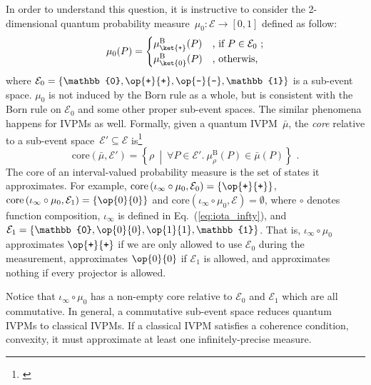 \documentclass[english,reprint, aps, prl,superscriptaddress, showpacs,
showkeys, longbibliography, amsmath, amssymb]{revtex4-1}
\theoremstyle{plain}
\theoremstyle{definition}
\newcommand{\events}{\ensuremath{\mathcal{E}}}
\newcommand{\proj}[1]{\op{#1}{#1}}
\newcommand{\ps}{\texttt{+}}
\newcommand{\ms}{\texttt{-}}
\newcommand{\yutsung}[1]{\begin{framed}\begin{minipage}{0.9\linewidth}\color{purple}{Yu-Tsung says: #1}\end{minipage}\end{framed}}
\newcommand{\set}[2]{\ensuremath{\left\{ {#1}~\middle|~{#2}\right\} }}
\begin{document}
In order to understand this question, it is instructive to consider
the 2-dimensional quantum probability measure~$\mu_{0}:\events\rightarrow[0,1]$
defined as follow:
\begin{equation}
\mu_{0}(P)=\begin{cases}
\mu_{\ket{\ps}}^{\mathrm{B}}(P) & \textrm{, if }P\in\events_{0}\textrm{ ;}\\
\mu_{\ket{0}}^{\mathrm{B}}(P) & \textrm{, otherwis,}
\end{cases}
\end{equation}
where $\events_{0}=\left\{ \mathbb{0},\proj{\ps},\proj{\ms},\mathbb{1}\right\} $
is a sub-event space. $\mu_{0}$ is not induced by the Born rule as
a whole, but is consistent with the Born rule on $\events_{0}$ and
some other proper sub-event spaces. The similar phenomena happens
for IVPMs as well. Formally, given a quantum IVPM~$\bar{\mu}$, the
\emph{core} relative to a sub-event space~$\events'\subseteq\events$
is\footnote{\yutsung{I changed the definition of core to embedding the Born rule.
While this change might make it easier to explain the core of quantum
IVPMs, should we explain the meaning of the Born rule for classical
probability measures?}}
\begin{equation}
\mathrm{core}\left(\bar{\mu},\events'\right)=\set{\rho}{\forall P\in\events'.~\mu_{\rho}^{\mathrm{B}}\left(P\right)\in\bar{\mu}\left(P\right)}\textrm{ .}
\end{equation}
The core of an interval-valued probability measure is the set of states
it approximates. For example, $\mathrm{core}\left(\iota_{\infty}\circ\mu_{0},\events_{0}\right)=\left\{ \proj{\ps}\right\} $,
$\mathrm{core}\left(\iota_{\infty}\circ\mu_{0},\events_{1}\right)=\left\{ \proj{0}\right\} $
and $\mathrm{core}\left(\iota_{\infty}\circ\mu_{0},\events\right)=\emptyset$,
where $\circ$ denotes function composition, $\iota_{\infty}$ is
defined in Eq.~(\ref{eq:iota_infty}), and $\events_{1}=\left\{ \mathbb{0},\proj{0},\proj{1},\mathbb{1}\right\} $.
That is, $\iota_{\infty}\circ\mu_{0}$ approximates $\proj{\ps}$
if we are only allowed to use $\events_{0}$ during the measurement,
approximates $\proj{0}$ if $\events_{1}$ is allowed, and approximates
nothing if every projector is allowed.

Notice that $\iota_{\infty}\circ\mu_{0}$ has a non-empty core relative
to $\events_{0}$ and $\events_{1}$ which are all commutative. In
general, a commutative sub-event space reduces quantum IVPMs to classical
IVPMs. If a classical IVPM satisfies a coherence condition, convexity,
it must approximate at least one infinitely-precise measure.
\end{document}
